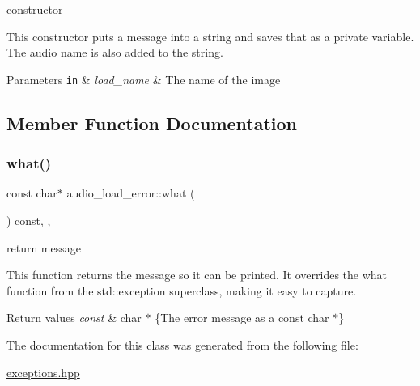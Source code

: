 constructor 

This constructor puts a message into a string and saves that as a private variable. The audio name is also added to the string.


\begin{DoxyParams}[1]{Parameters}
\mbox{\tt in}  & {\em load\+\_\+name} & The name of the image \\
\hline
\end{DoxyParams}


\subsection{Member Function Documentation}
\mbox{\label{classaudio__load__error_a364ad9c1cb7de37f0cb3e33dbebbaa47}} 
\subsubsection{\texorpdfstring{what()}{what()}}
{\footnotesize\ttfamily const char$\ast$ audio\+\_\+load\+\_\+error\+::what (\begin{DoxyParamCaption}{ }\end{DoxyParamCaption}) const\hspace{0.3cm}{\ttfamily [inline]}, {\ttfamily [override]}, {\ttfamily [noexcept]}}



return message 

This function returns the message so it can be printed. It overrides the what function from the std\+::exception superclass, making it easy to capture.


\begin{DoxyRetVals}{Return values}
{\em const} & char $\ast$ \{The error message as a const char $\ast$\} \\
\hline
\end{DoxyRetVals}


The documentation for this class was generated from the following file\+:\begin{DoxyCompactItemize}
\item 
\hyperlink{exceptions_8hpp}{exceptions.\+hpp}\end{DoxyCompactItemize}
